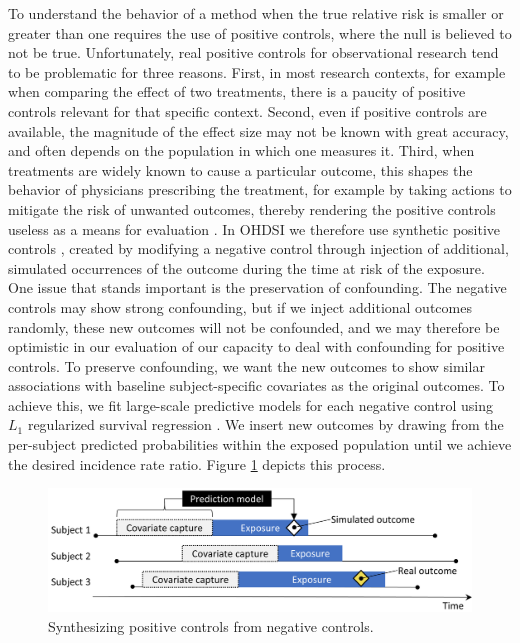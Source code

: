 \documentclass[]{book}
\begin{document}
To understand the behavior of a method when the true relative risk is
smaller or greater than one requires the use of positive controls, where
the null is believed to not be true. Unfortunately, real positive
controls for observational research tend to be problematic for three
reasons. First, in most research contexts, for example when comparing
the effect of two treatments, there is a paucity of positive controls
relevant for that specific context. Second, even if positive controls
are available, the magnitude of the effect size may not be known with
great accuracy, and often depends on the population in which one
measures it. Third, when treatments are widely known to cause a
particular outcome, this shapes the behavior of physicians prescribing
the treatment, for example by taking actions to mitigate the risk of
unwanted outcomes, thereby rendering the positive controls useless as a
means for evaluation \citep{noren_2014}. In OHDSI we therefore use
synthetic positive controls \citep{schuemie_2018}, created by modifying
a negative control through injection of additional, simulated
occurrences of the outcome during the time at risk of the exposure. One
issue that stands important is the preservation of confounding. The
negative controls may show strong confounding, but if we inject
additional outcomes randomly, these new outcomes will not be confounded,
and we may therefore be optimistic in our evaluation of our capacity to
deal with confounding for positive controls. To preserve confounding, we
want the new outcomes to show similar associations with baseline
subject-specific covariates as the original outcomes. To achieve this,
we fit large-scale predictive models for each negative control using
\(L_1\) regularized survival regression \citep{suchard_2013}. We insert
new outcomes by drawing from the per-subject predicted probabilities
within the exposed population until we achieve the desired incidence
rate ratio. Figure \ref{fig:posControlSynth} depicts this process.

\begin{figure}

{\centering \includegraphics[width=0.9\linewidth]{images/MethodValidity/posControlSynth} 

}

\caption{Synthesizing positive controls from negative controls.}\label{fig:posControlSynth}
\end{figure}
\end{document}

